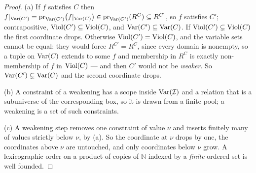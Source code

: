 \begin{proof}
(a) If $f$ satisfies $C$ then
$f|_{\operatorname{Var}(C')}=\operatorname*{pr}_{\operatorname{Var}(C')}\bigl(f|_{\operatorname{Var}(C)}\bigr)\in
\operatorname*{pr}_{\operatorname{Var}(C')}(R^{C})\subseteq R^{C'}$, so $f$ satisfies $C'$; contrapositive,
$\operatorname{Viol}(C')\subseteq\operatorname{Viol}(C)$, and $\operatorname{Var}(C')\subseteq\operatorname{Var}(C)$. If
$\operatorname{Viol}(C')\subsetneq\operatorname{Viol}(C)$ the first coordinate drops. Otherwise
$\operatorname{Viol}(C')=\operatorname{Viol}(C)$, and the variable sets cannot be equal: they would force
$R^{C'}=R^{C}$, since every domain is nonempty, so a tuple on $\operatorname{Var}(C)$ extends
to some $f$ and membership in $R^{C}$ is exactly non-membership of $f$ in
$\operatorname{Viol}(C)$ --- and then $C'$ would not be \emph{weaker}. So
$\operatorname{Var}(C')\subsetneq\operatorname{Var}(C)$ and the second coordinate drops.

(b) A constraint of a weakening has a scope inside $\operatorname{Var}(\mathcal I)$ and a
relation that is a subuniverse of the corresponding box, so it is drawn from a
finite pool; a weakening is a set of such constraints.

(c) A weakening step removes one constraint of value $\nu$ and inserts finitely
many of values strictly below $\nu$, by (a). So the coordinate at $\nu$ drops
by one, the coordinates above $\nu$ are untouched, and only coordinates below
$\nu$ grow. A lexicographic order on a product of copies of $\mathbb N$ indexed
by a \emph{finite} ordered set is well founded.
\end{proof}

